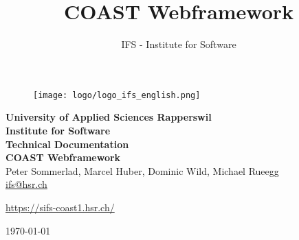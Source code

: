 \documentclass[11pt,a4paper,oneside]{scrreprt}
\title{COAST Webframework}
\author{IFS - Institute for Software}
\begin{document}
\begin{titlepage}
\topmargin 0in
\thispagestyle{empty}
\begin{center}
\begin{figure}[h]
 \centering
 \texttt{[image: logo/logo\_ifs\_english.png]}
\end{figure}
\vspace{1,5cm}
{\Large \bfseries University of Applied Sciences Rapperswil\\} 
\vspace{0,5cm}
{\Large \bfseries Institute for Software\\}
\vspace{2cm}
\sffamily
{\Huge \bfseries Technical Documentation}\\
\vspace{0.5cm}
{\Huge \bfseries COAST Webframework}\\
\vspace{1,5cm}
Peter Sommerlad, Marcel Huber, Dominic Wild, Michael Rueegg\\\url{ifs@hsr.ch}\\\vspace{1,0cm}
\begin{scriptsize}\url{https://sifs-coast1.hsr.ch/}\\\end{scriptsize}
\vspace{2,5cm}
\vspace{0,3cm}
\today
\end{center}
\end{titlepage}

\setcounter{tocdepth}{2}
\tableofcontents



\end{document}
